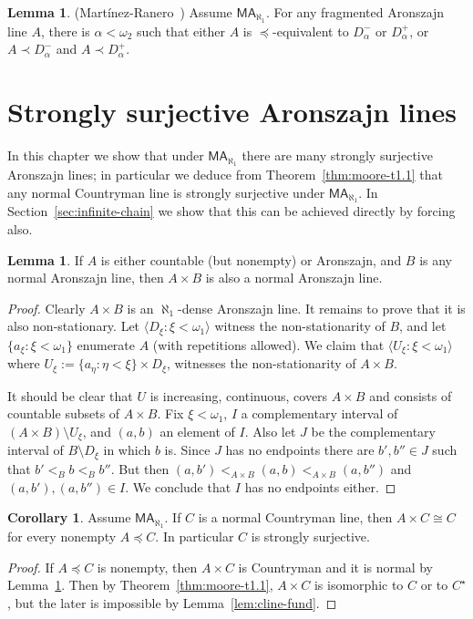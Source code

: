 \documentclass[10pt]{amsart}
\theoremstyle{definition}
\newtheorem{corollary}[theorem]{Corollary}
\newtheorem{lemma}[theorem]{Lemma}
\theoremstyle{remark}
\newcommand{\setm}{\setminus}
\newcommand{\tup}[1]{\langle#1\rangle}
\newcommand{\axiom}[1]{\mathsf{#1}}
\newcommand{\MA}{\axiom{MA}}
\newcommand{\ele}{\prec}
\newcommand{\eleq}{\preceq}
\newcommand{\1}{\mathbbm{1}}
\begin{document}
\begin{lemma}\label{lem:D_a} (Martínez-Ranero~\cite{Martinez})
  Assume $\MA_{\aleph_{1}}$. For any fragmented Aronszajn line $A$,
  there is $\alpha < \omega_{2}$ such that
  either $A$ is $\eleq$-equivalent to $D_{\alpha}^{-}$ or
  $D_{\alpha}^{+}$, or $A \ele D_{\alpha}^{-}$ and $A \ele D_{\alpha}^{+}$.
\end{lemma}

\section{Strongly surjective Aronszajn lines}\label{sec:srs}

In this chapter we show that under $\MA_{\aleph_{1}}$ there are many
strongly surjective Aronszajn lines; in particular we deduce
from Theorem~\ref{thm:moore-t1.1} that any normal
Countryman line is strongly surjective under $\MA_{\aleph_{1}}$.
In Section~\ref{sec:infinite-chain} we
show that this can be achieved directly by forcing also.


\begin{lemma}\label{lem:c-prod}
  If $A$ is either countable (but nonempty) or Aronszajn, and $B$ is
  any normal Aronszajn line, then $A \times B$ is also a normal
  Aronszajn line.
\end{lemma}
\begin{proof}
  Clearly $A \times B$ is an $\aleph_{1}$-dense Aronszajn line.
  It remains to prove that it is also non-stationary.
  Let $\tup{D_{\xi} : \xi < \omega_{1}}$ witness the non-stationarity
  of $B$, and let $\{a_{\xi} : \xi < \omega_{1}\}$ enumerate $A$ (with
  repetitions allowed). We claim that $\tup{U_{\xi} : \xi < \omega_{1}}$
  where $U_{\xi} := \{a_{\eta} : \eta <
  \xi\} \times D_{\xi}$,  witnesses the non-stationarity of $A \times B$.

  It should be clear that $U$ is increasing, continuous, covers $A \times B$ and
  consists of countable subsets of $A \times B$. Fix $\xi < \omega_{1}$,
  $I$ a complementary interval of $(A\times B) \setm U_{\xi}$,
  and $(a,b)$ an element of $I$. Also let $J$ be the complementary interval
  of $B \setm D_{\xi}$ in which $b$ is. Since $J$ has no endpoints
  there are $b',b'' \in J$ such that $b' <_{B} b <_{B} b''$. But then
  $(a,b') <_{A \times B} (a,b) <_{A\times B} (a,b'')$ and $(a,b'),(a,b'') \in I$.
  We conclude that $I$ has no endpoints either.
\end{proof}


\begin{corollary}\label{cor:cline-srs}
  Assume $\MA_{\aleph_{1}}$. If $C$ is a normal Countryman line, then $A
  \times C \cong C$ for every nonempty $A \eleq C$. In particular $C$ is
  strongly surjective.
\end{corollary}
\begin{proof}
  If $A \eleq C$ is nonempty, then $A \times C$ is Countryman and it is
  normal by Lemma~\ref{lem:c-prod}. Then by Theorem~\ref{thm:moore-t1.1}, $A \times C$
  is isomorphic to $C$ or to $C^{\star}$, but the later is impossible
  by Lemma~\ref{lem:cline-fund}.
\end{proof}
\end{document}
